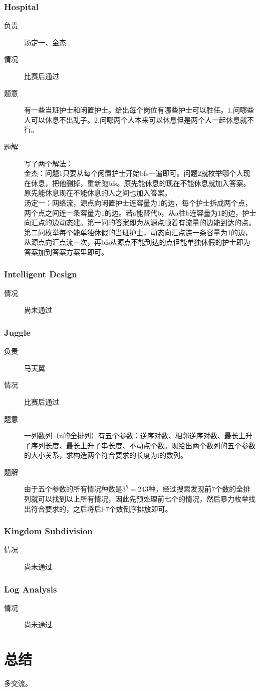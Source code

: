 \documentclass[a4paper, 11pt, nofonts, nocap, fancyhdr]{ctexart}
\newcommand{\problem}[1]{\subsubsection{#1}}
\begin{document}
\problem{Hospital}

\begin{description}
\item[负责] 汤定一、金杰
\item[情况] 比赛后通过
\item[题意]
有一些当班护士和闲置护士。给出每个岗位有哪些护士可以胜任。1.问哪些人可以休息不出乱子。2.问哪两个人本来可以休息但是两个人一起休息就不行。
\item[题解]
写了两个解法：\\
金杰：问题1只要从每个闲置护士开始bfs一遍即可。问题2就枚举哪个人现在休息，把他删掉，重新跑bfs。原先能休息的现在不能休息就加入答案。原先能休息现在不能休息的人之间也加入答案。\\
汤定一：网络流，源点向闲置护士连容量为1的边，每个护士拆成两个点，两个点之间连一条容量为1的边。若a能替代b，从a往b连容量为1的边，护士向汇点的边动态建。第一问的答案即为从源点顺着有流量的边能到达的点。第二问枚举每个能单独休假的当班护士，动态向汇点连一条容量为1的边，从源点向汇点流一次，再bfs从源点不能到达的点但能单独休假的护士即为答案加到答案方案里即可。
\end{description}

\problem{Intelligent Design}

\begin{description}
\item[情况] 尚未通过
\end{description}

\problem{Juggle}

\begin{description}
\item[负责] 马天翼
\item[情况] 比赛后通过
\item[题意]
一列数列（n的全排列）有五个参数：逆序对数、相邻逆序对数、最长上升子序列长度、最长上升子串长度、不动点个数。现给出两个数列的五个参数的大小关系，求构造两个符合要求的长度为l的数列。
\item[题解]
由于五个参数的所有情况种数是$3^5=243$种，经过搜索发现前7个数的全排列就可以找到以上所有情况，因此先预处理前七个的情况，然后暴力枚举找出符合要求的，之后将后l-7个数倒序排放即可。
\end{description}

\problem{Kingdom Subdivision}

\begin{description}
\item[情况] 尚未通过
\end{description}

\problem{Log Analysis}

\begin{description}
\item[情况] 尚未通过
\end{description}

\section{总结}

多交流。
\end{document}
